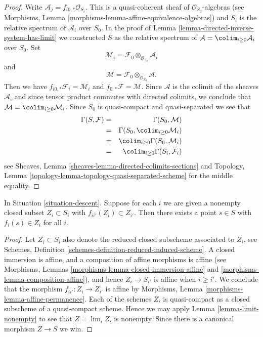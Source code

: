 \begin{proof}
Write $\mathcal{A}_j = f_{i0, *} \mathcal{O}_{S_i}$.
This is a quasi-coherent sheaf of $\mathcal{O}_{S_0}$-algebras
(see Morphisms, Lemma \ref{morphisms-lemma-affine-equivalence-algebras})
and $S_i$ is the relative spectrum of $\mathcal{A}_i$ over $S_0$.
In the proof of Lemma \ref{lemma-directed-inverse-system-has-limit}
we constructed $S$ as the relative spectrum of
$\mathcal{A} = \colim_{i \geq 0} \mathcal{A}_i$
over $S_0$. Set
$$
\mathcal{M}_i = \mathcal{F}_0 \otimes_{\mathcal{O}_{S_0}} \mathcal{A}_i
$$
and
$$
\mathcal{M} = \mathcal{F}_0 \otimes_{\mathcal{O}_{S_0}} \mathcal{A}.
$$
Then we have $f_{i0, *} \mathcal{F}_i = \mathcal{M}_i$
and $f_{0, *}\mathcal{F} = \mathcal{M}$. Since $\mathcal{A}$
is the colimit of the sheaves $\mathcal{A}_i$ and since tensor
product commutes with directed colimits, we conclude that
$\mathcal{M} = \colim_{i \geq 0} \mathcal{M}_i$.
Since $S_0$ is quasi-compact and quasi-separated we see that
\begin{eqnarray*}
\Gamma(S, \mathcal{F})
& = &
\Gamma(S_0, \mathcal{M}) \\
& = &
\Gamma(S_0, \colim_{i \geq 0} \mathcal{M}_i) \\
& = &
\colim_{i \geq 0} \Gamma(S_0, \mathcal{M}_i) \\
& = &
\colim_{i \geq 0} \Gamma(S_i, \mathcal{F}_i)
\end{eqnarray*}
see Sheaves, Lemma \ref{sheaves-lemma-directed-colimits-sections} and
Topology, Lemma \ref{topology-lemma-topology-quasi-separated-scheme}
for the middle equality.
\end{proof}

\begin{lemma}
\label{lemma-limit-closed-nonempty}
In Situation \ref{situation-descent}.
Suppose for each $i$ we are given a nonempty closed subset
$Z_i \subset S_i$ with $f_{ii'}(Z_i) \subset Z_{i'}$.
Then there exists a point $s \in S$ with $f_i(s) \in Z_i$ for
all $i$.
\end{lemma}

\begin{proof}
Let $Z_i \subset S_i$ also denote the reduced closed subscheme
associated to $Z_i$, see Schemes,
Definition \ref{schemes-definition-reduced-induced-scheme}.
A closed immersion is affine, and a composition of affine
morphisms is affine (see
Morphisms, Lemmas \ref{morphisms-lemma-closed-immersion-affine}
and \ref{morphisms-lemma-composition-affine}), and hence $Z_i \to S_{i'}$ is
affine when $i \geq i'$. We conclude that the morphism
$f_{ii'} : Z_i \to Z_{i'}$ is affine by
Morphisms, Lemma \ref{morphisms-lemma-affine-permanence}.
Each of the schemes $Z_i$ is quasi-compact as a closed
subscheme of a quasi-compact scheme. Hence we may apply
Lemma \ref{lemma-limit-nonempty} to see that
$Z = \lim_i Z_i$ is nonempty. Since there is a
canonical morphism $Z \to S$ we win.
\end{proof}

